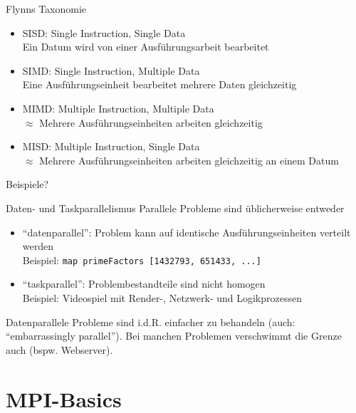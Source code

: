 \documentclass{beamer}
\begin{document}
\begin{frame}{Flynns Taxonomie}
	\begin{itemize}
		\item SISD: Single Instruction, Single Data\\
			{\footnotesize Ein Datum wird von einer Ausführungsarbeit bearbeitet}
		\item SIMD: Single Instruction, Multiple Data\\
			{\footnotesize Eine Ausführungseinheit bearbeitet mehrere Daten gleichzeitig}
		\item MIMD: Multiple Instruction, Multiple Data\\
			{\footnotesize $\approx$ Mehrere Ausführungseinheiten arbeiten gleichzeitig}
		\item MISD: Multiple Instruction, Single Data\\
			{\footnotesize $\approx$ Mehrere Ausführungseinheiten arbeiten gleichzeitig an einem Datum}
	\end{itemize}

	\pause
	Beispiele?
\end{frame}

\begin{frame}{Daten- und Taskparallelismus}
	Parallele Probleme sind üblicherweise entweder
	
	\begin{itemize}
		\item \enquote{datenparallel}: Problem kann auf identische Ausführungseinheiten verteilt werden\\
			Beispiel: \texttt{map primeFactors [1432793, 651433, ...]}

		\item \enquote{taskparallel}: Problembestandteile sind nicht homogen\\
			Beispiel: Videospiel mit Render-, Netzwerk- und Logikprozessen
	\end{itemize}

	Datenparallele Probleme sind i.d.R. einfacher zu behandeln (auch: \enquote{embarrassingly parallel}).
	Bei manchen Problemen verschwimmt die Grenze auch (bspw. Webserver).
\end{frame}

\section{MPI-Basics}
\end{document}
